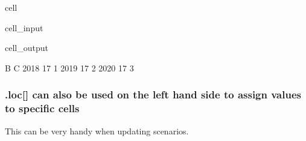 \documentclass[letterpaper,10pt,english]{jupyterBook}
\begin{document}
\begin{sphinxuseclass}{cell}\begin{sphinxVerbatimInput}

\begin{sphinxuseclass}{cell_input}
\begin{sphinxVerbatim}[commandchars=\\\{\}]
\PYG{p}{[}\PYG{p}{[}\PYG{p}{]}\PYG{p}{]}
\end{sphinxVerbatim}

\end{sphinxuseclass}\end{sphinxVerbatimInput}
\begin{sphinxVerbatimOutput}

\begin{sphinxuseclass}{cell_output}
\begin{sphinxVerbatim}[commandchars=\\\{\}]
       B  C
2018  17  1
2019  17  2
2020  17  3
\end{sphinxVerbatim}

\end{sphinxuseclass}\end{sphinxVerbatimOutput}

\end{sphinxuseclass}

\subsubsection{.loc{[}{]} can also be used on the left hand side to assign values to specific cells}
\label{\detokenize{content/04_PythonEssentials/PythonPandasDataframes:loc-can-also-be-used-on-the-left-hand-side-to-assign-values-to-specific-cells}}
\sphinxAtStartPar
This can be very handy when updating scenarios.
\end{document}

